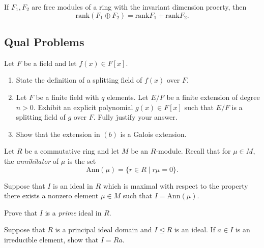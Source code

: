 \begin{problem}[Hungerford 4.2.9]
\label{prob:1.1}
If $F_1, F_2$ are free modules of a ring with the invariant dimension proerty, then 
\[
\mathrm{rank}(F_1 \oplus F_2) = \mathrm{rank} F_1 + \mathrm{rank} F_2.
\]
\end{problem}

\newpage
\subsection{Qual Problems}

\begin{problem}
\label{prob:1.1}
Let $F$ be a field and let $f(x) \in F[x]$.
\begin{enumerate}
    \item State the definition of a splitting field of $f(x)$ over $F$.
    
    \item Let $F$ be a finite field with $q$ elements. Let $E/F$ be a finite extension of degree $n>0$. Exhibit an explicit polynomial $g(x) \in F[x]$ such that $E/F$ is a splitting field of $g$ over $F$. Fully justify your answer.
    
    \item Show that the extension in $(b)$ is a Galois extension.
\end{enumerate}
\end{problem}

\begin{problem}
\label{prob:1.1}
Let $R$ be a commutative ring and let $M$ be an $R$-module. Recall that for $\mu \in M$, the \textit{annihilator} of $\mu$ is the set 
\[
\mathrm{Ann}(\mu) = \{ r\in R \mid r\mu = 0\}.
\]

Suppose that $I$ is an ideal in $R$ which is maximal with respect to the property there exists a nonzero element $\mu \in M$ such that $I = \mathrm{Ann}(\mu)$.

Prove that $I$ is a \textit{prime} ideal in $R$.

\end{problem}

\begin{problem}
\label{prob:1.1}
Suppose that $R$ is a principal ideal domain and $I \trianglelefteq R$ is an ideal. If $a\in I$ is an irreducible element, show that $I = Ra$.
\end{problem}
